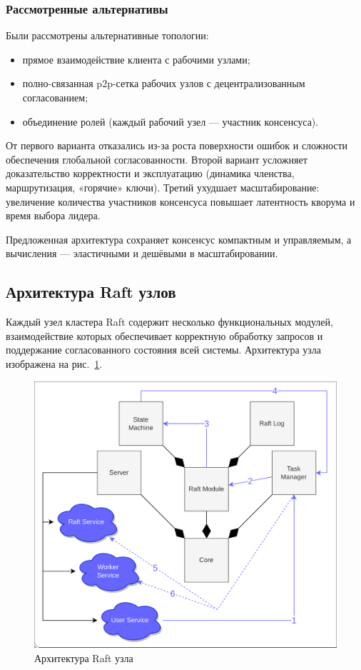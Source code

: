 \subsubsection{Рассмотренные альтернативы}

Были рассмотрены альтернативные топологии:

\begin{itemize}
\item прямое взаимодействие клиента с рабочими узлами;
\item полно-связанная p2p-сетка рабочих узлов с децентрализованным согласованием;
\item объединение ролей (каждый рабочий узел — участник консенсуса).
\end{itemize}

От первого варианта отказались из-за роста поверхности ошибок и сложности
обеспечения глобальной согласованности. Второй вариант усложняет доказательство
корректности и эксплуатацию (динамика членства, маршрутизация, «горячие»
ключи). Третий ухудшает масштабирование: увеличение количества участников
консенсуса повышает латентность кворума и время выбора лидера.

Предложенная архитектура сохраняет консенсус компактным и управляемым, а
вычисления — эластичными и дешёвыми в масштабировании.

\subsection{Архитектура Raft узлов}

Каждый узел кластера Raft содержит несколько функциональных модулей,
взаимодействие которых обеспечивает корректную обработку запросов и поддержание
согласованного состояния всей системы. Архитектура узла изображена на
рис.~\ref{fig:raft-overview}.

\begin{figure}
  \centering
  \includegraphics[scale=0.25]{inc/raft-arch.png}
  \caption{Архитектура Raft узла}
  \label{fig:raft-overview}
\end{figure}

